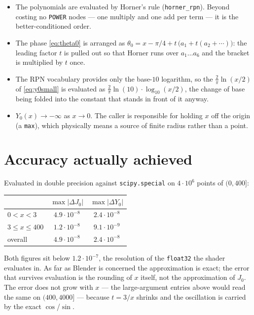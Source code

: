 \documentclass[11pt,a4paper]{article}
\newcommand{\node}[1]{\texttt{#1}}
\begin{document}
\begin{itemize}[leftmargin=1.4em]
\item The polynomials are evaluated by Horner's rule
      (\node{horner\_rpn}). Beyond costing no \node{POWER} nodes --- one
      multiply and one add per term --- it is the better-conditioned order.
\item The phase \eqref{eq:theta0} is arranged as
      $\theta_0 = x - \pi/4 + t\,\big(a_1 + t(a_2 + \cdots)\big)$: the leading
      factor $t$ is pulled out so that Horner runs over $a_1\ldots a_6$ and
      the bracket is multiplied by $t$ once.
\item The RPN vocabulary provides only the base-$10$ logarithm, so the
      $\tfrac{2}{\pi}\ln(x/2)$ of \eqref{eq:y0small} is evaluated as
      $\tfrac{2}{\pi}\ln(10)\cdot\log_{10}(x/2)$, the change of base being
      folded into the constant that stands in front of it anyway.
\item $Y_0(x)\to-\infty$ as $x\to0$. The caller is responsible for holding
      $x$ off the origin (a \node{max}), which physically means a source of
      finite radius rather than a point.
\end{itemize}

\section{Accuracy actually achieved}

Evaluated in double precision against \node{scipy.special} on
$4\cdot10^{6}$ points of $(0,400]$:

\begin{center}
\begin{tabular}{lcc}
\toprule
                    & $\max|\Delta J_0|$ & $\max|\Delta Y_0|$ \\
\midrule
$0 < x < 3$         & $4.9\cdot10^{-8}$  & $2.4\cdot10^{-8}$ \\
$3 \le x \le 400$   & $1.2\cdot10^{-8}$  & $9.1\cdot10^{-9}$ \\
\midrule
overall             & $4.9\cdot10^{-8}$  & $2.4\cdot10^{-8}$ \\
\bottomrule
\end{tabular}
\end{center}

Both figures sit below $1.2\cdot10^{-7}$, the resolution of the
\texttt{float32} the shader evaluates in. As far as Blender is concerned the
approximation is exact; the error that survives evaluation is the rounding of
$x$ itself, not the approximation of $J_0$. The error does not grow with $x$
--- the large-argument entries above would read the same on $(400,4000]$ ---
because $t=3/x$ shrinks and the oscillation is carried by the exact
$\cos$/$\sin$.
\end{document}
